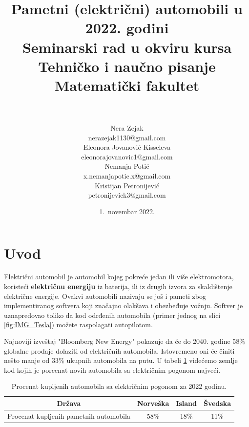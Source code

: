 \documentclass[a4paper]{article}
\begin{document}
\title{Pametni (električni) automobili u 2022. godini\vspace{3ex}\\ \small{Seminarski rad u okviru kursa\\Tehničko i naučno pisanje\\ Matematički fakultet}}

\author{\\\\Nera Zejak\\\footnotesize {nerazejak1130@gmail.com}\\Eleonora Jovanović Kisseleva\\\footnotesize {eleonorajovanovic1@gmail.com}\\Nemanja Potić\\\footnotesize {x.nemanjapotic.x@gmail.com}\\Kristijan Petronijević\\\footnotesize {petronijevick3@gmail.com}\\}
\date{1.~novembar 2022.}
\maketitle



\tableofcontents

\newpage

\section{Uvod}
   Električni automobil  je automobil kojeg pokreće jedan ili više elektromotora, koristeći \textbf{električnu energiju} iz baterija, ili iz drugih izvora za skaldištenje električne energije. Ovakvi automobili nazivaju se još i pameti zbog implementiranog softvera koji značajno olakšava i obezbeđuje vožnju. Softver je uznapredovao toliko da kod odrđenih automobila (primer jednog na slici \ref{fig:IMG_Tesla}) možete raspolagati autopilotom.
    
    
Najnoviji izveštaj "Bloomberg New Energy" pokazuje da će do 2040. godine 58\% globalne prodaje dolaziti od električnih automobila. Istovremeno oni će činiti nešto manje od 33\% ukupnih automobila na putu. U tabeli \ref{tab:tabela1} videćemo zemlje kod kojih je porcenat novih automobila sa električnim pogonom najveći.

\begin{table}[h!]
\begin{center}
\caption{Procenat kupljenih automobila sa električnim pogonom za 2022 godinu.}
\begin{tabular}{|c|c|c|c|} \hline
Država& Norveška& Island& Švedska\\ \hline
Procenat kupljenih pametnih automobila& 58\%& 18\%& 11\%\\ \hline
\end{tabular}
\label{tab:tabela1}
\end{center}
\end{table}
\end{document}
